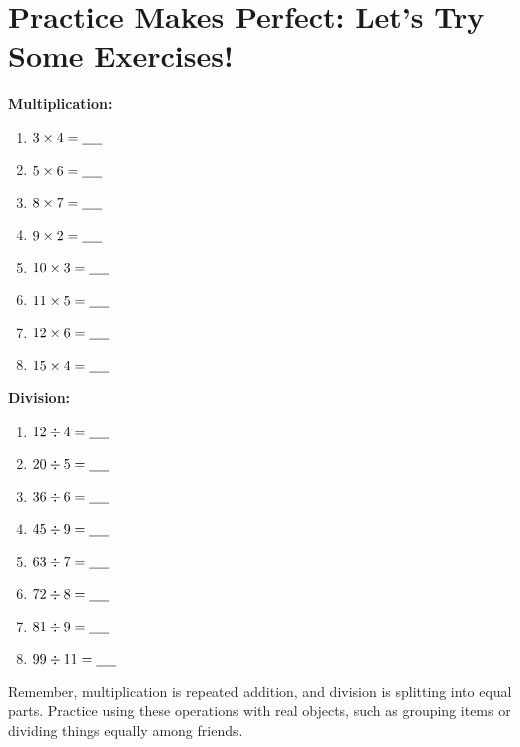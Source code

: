 \section{Practice Makes Perfect: Let’s Try Some Exercises!}
\begin{multicols}{2}
    \textbf{Multiplication:}
    \begin{enumerate}[label=(\alph*)]
        \item $3 \times 4 = \underline{\hspace{0.5cm}}$
        \item $5 \times 6 = \underline{\hspace{0.5cm}}$
        \item $8 \times 7 = \underline{\hspace{0.5cm}}$
        \item $9 \times 2 = \underline{\hspace{0.5cm}}$
        \item $10 \times 3 = \underline{\hspace{0.5cm}}$
        \item $11 \times 5 = \underline{\hspace{0.5cm}}$
        \item $12 \times 6 = \underline{\hspace{0.5cm}}$
        \item $15 \times 4 = \underline{\hspace{0.5cm}}$
    \end{enumerate}

    \textbf{Division:}
    \begin{enumerate}[label=(\alph*)]
        \item $12 \div 4 = \underline{\hspace{0.5cm}}$
        \item $20 \div 5 = \underline{\hspace{0.5cm}}$
        \item $36 \div 6 = \underline{\hspace{0.5cm}}$
        \item $45 \div 9 = \underline{\hspace{0.5cm}}$
        \item $63 \div 7 = \underline{\hspace{0.5cm}}$
        \item $72 \div 8 = \underline{\hspace{0.5cm}}$
        \item $81 \div 9 = \underline{\hspace{0.5cm}}$
        \item $99 \div 11 = \underline{\hspace{0.5cm}}$
    \end{enumerate}
\end{multicols}
Remember, multiplication is repeated addition, and division is splitting into equal parts. Practice using these operations with real objects, such as grouping items or dividing things equally among friends.

